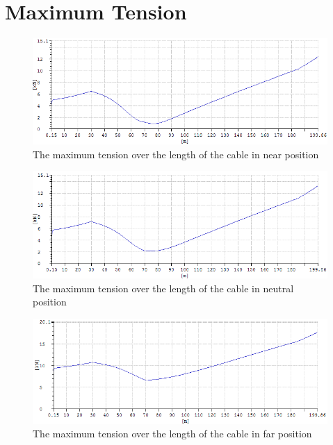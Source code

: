 \section{Maximum Tension}

\begin{figure}[H]
\centering
\includegraphics[scale=0.5]{figures/fmaxnear}
\caption[$\; \:$The maximum tension over the length of the cable in near position]{The maximum tension over the length of the cable in near position}
 \label{fig:fmaxnear}
\end{figure}


\begin{figure}[H]
\centering
\includegraphics[scale=0.5]{figures/fmaxneu}
\caption[$\; \:$The maximum tension over the length of the cable in neutral position]{The maximum tension over the length of the cable in neutral position}
 \label{fig:fmaxneu}
\end{figure}


\begin{figure}[H]
\centering
\includegraphics[scale=0.5]{figures/fmaxfar}
\caption[$\; \:$The maximum tension over the length of the cable in far position]{The maximum tension over the length of the cable in far position}
 \label{fig:fmaxfar}
\end{figure}

